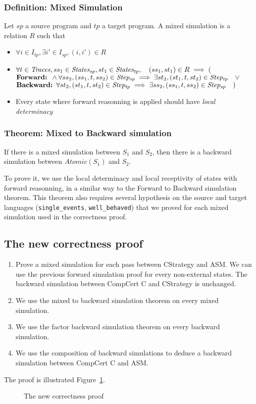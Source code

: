 \subsubsection{Definition: Mixed Simulation} Let $sp$ a source program and $tp$ a target program. A mixed simulation is a relation $R$ such that
\begin{itemize}
\item $\forall i\in I_{tp}, \exists i'\in I_{sp}, (i,i')\in R$
\item $\forall t\in\mathit{Traces}, ss_1\in\mathit{States_{sp}},st_1\in\mathit{States_{tp}},\quad(ss_1,st_1)\in R\implies ($\\
      $\textbf{Forward: }\wedge\forall ss_2, (ss_1,t,ss_2)\in\mathit{Step_{sp}}\implies\exists st_2, (st_1,t,st_2)\in\mathit{Step_{tp}}  \quad\vee$\\
      $\textbf{Backward: }\forall st_2, (st_1,t,st_2)\in\mathit{Step_{tp}}\implies\exists ss_2, (ss_1,t,ss_2)\in\mathit{Step_{sp}} \quad)$
\item Every state where forward reasonning is applied should have \textit{local determinacy}
\end{itemize}

\mixed

\subsubsection{Theorem: Mixed to Backward simulation}
If there is a mixed simulation between $S_1$ and $S_2$, then there is a backward simulation between $\mathit{Atomic}(S_1)$ and $S_2$.

To prove it, we use the local determinacy and local receptivity of states with forward reasonning, in a similar way to the Forward to Backward simulation theorem. This theorem also requires several hypothesis on the source and target languages (\texttt{single\_events}, \texttt{well\_behaved}) that we proved for each mixed simulation used in the correctness proof.

\subsection{The new correctness proof}
\begin{enumerate}
\item Prove a mixed simulation for each pass between CStrategy and ASM. We can use the previous forward simulation proof for every non-external states. The backward simulation between CompCert C and CStrategy is unchanged.
\item We use the mixed to backward simulation theorem on every mixed simulation.
\item We use the factor backward simulation theorem on every backward simulation.
\item We use the composition of backward simulations to deduce a backward simulation between CompCert C and ASM.
\end{enumerate}

The proof is illustrated Figure~\ref{fig:mixedproof}.

\begin{figure}
  \makebox[\textwidth][c]{\mixedproof}
  \caption{The new correctness proof}
  \label{fig:mixedproof}
\end{figure}
